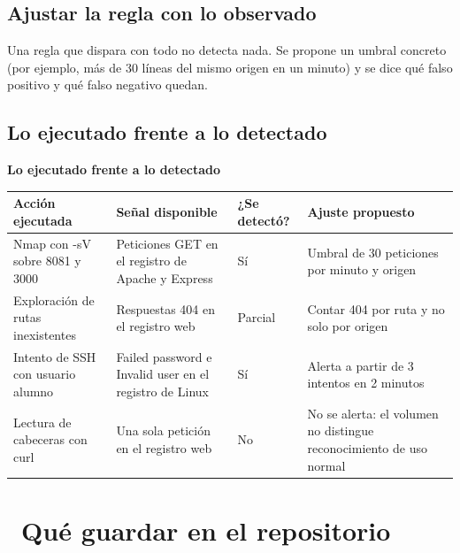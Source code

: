 \documentclass[11pt,a4paper]{article}
\newcommand{\iconotexto}[2]{\textcolor{cyanNeon}{\faIcon{#1}}~#2}
\begin{document}
\subsection{Ajustar la regla con lo observado}

Una regla que dispara con todo no detecta nada. Se propone un umbral concreto (por ejemplo, más de 30 líneas del mismo origen en un minuto) y se dice qué falso positivo y qué falso negativo quedan.

\subsection{Lo ejecutado frente a lo detectado}

\begin{center}
\begin{minipage}{\linewidth}
\centering
{\footnotesize
\textbf{Lo ejecutado frente a lo detectado}\par\smallskip
\begin{tabular}{@{}>{\raggedright\arraybackslash}p{3.55cm}>{\raggedright\arraybackslash}p{3.55cm}>{\raggedright\arraybackslash}p{3.55cm}>{\raggedright\arraybackslash}p{3.55cm}@{}}
\toprule
\textbf{Acción ejecutada} & \textbf{Señal disponible} & \textbf{¿Se detectó?} & \textbf{Ajuste propuesto} \\
\midrule
Nmap con -sV sobre 8081 y 3000 & Peticiones GET en el registro de Apache y Express & Sí & Umbral de 30 peticiones por minuto y origen \\
Exploración de rutas inexistentes & Respuestas 404 en el registro web & Parcial & Contar 404 por ruta y no solo por origen \\
Intento de SSH con usuario alumno & Failed password e Invalid user en el registro de Linux & Sí & Alerta a partir de 3 intentos en 2 minutos \\
Lectura de cabeceras con curl & Una sola petición en el registro web & No & No se alerta: el volumen no distingue reconocimiento de uso normal \\
\bottomrule
\end{tabular}
}
\par{}
\end{minipage}
\end{center}

\section{\iconotexto{box-open}{Qué guardar en el repositorio}}
\end{document}
